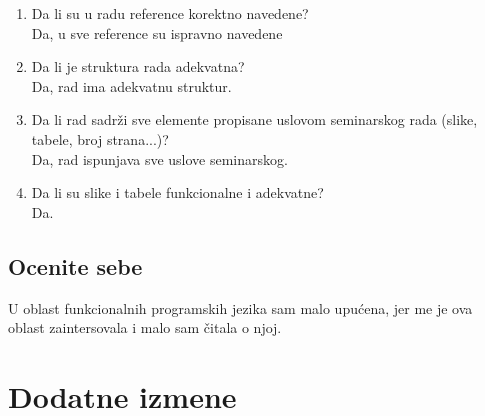 \documentclass[a4paper]{report}
\begin{document}
\begin{enumerate}
		\item Da li su u radu reference korektno navedene?\\
		Da, u sve reference su ispravno navedene
		
		\item Da li je struktura rada adekvatna?\\
		Da, rad ima adekvatnu struktur.
		
		\item Da li rad sadrži sve elemente propisane uslovom seminarskog rada (slike, tabele, broj strana...)?\\
		Da, rad ispunjava sve uslove seminarskog.
		
		\item Da li su slike i tabele funkcionalne i adekvatne?\\
		Da.
	\end{enumerate}
	
	\section{Ocenite sebe}
	
	U oblast funkcionalnih programskih jezika sam malo upućena, jer me je ova oblast zaintersovala i malo sam čitala o njoj.
	
	
	\chapter{Dodatne izmene}
	
\end{document}
